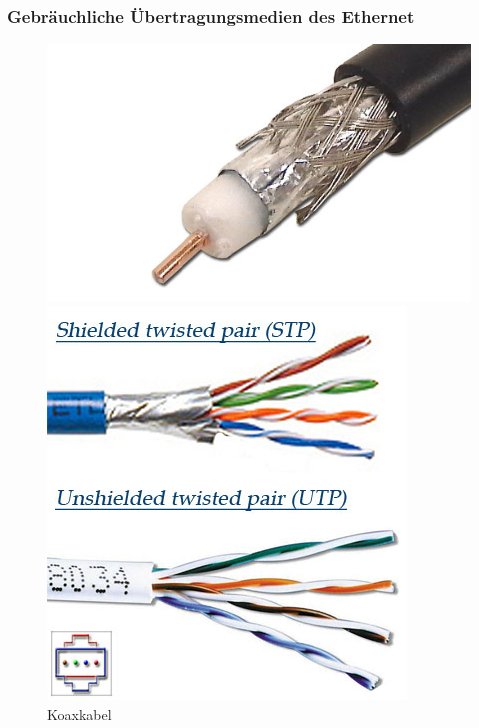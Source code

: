 \documentclass[12pt, a4paper, ngerman]{article}
\begin{document}
\subsubsection{Gebräuchliche Übertragungsmedien des Ethernet}
\begin{figure}[H]
\begin{minipage}[hbt]{.28\linewidth}
	\centering
	\includegraphics[width=0.9\linewidth]{Grafiken/koaxkabel.png}
	\caption{Koaxkabel \cite{koax_kabel}}
	\label{koaxkabel}
\end{minipage}
\hfill
\begin{minipage}[hbt]{.28\linewidth}
	\centering
	\includegraphics[width=0.9\linewidth]{Grafiken/twistetPair.jpg}

\end{minipage}
\end{figure}
\end{document}
